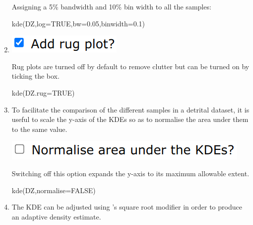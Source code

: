\begin{refsection}
\begin{enumerate}
Assigning a 5\% bandwidth and 10\% bin width to all the samples:

\begin{console}
kde(DZ,log=TRUE,bw=0.05,binwidth=0.1)
\end{console}

\item\noindent\begin{minipage}[t]{.18\linewidth}
\strut\vspace*{-\baselineskip}\newline
\includegraphics[width=\linewidth]{../figures/detritalrug.png}
\end{minipage}
\begin{minipage}[t]{.82\linewidth}
  Rug plots are turned off by default to remove clutter but can be
  turned on by ticking the box.
\end{minipage}

\begin{console}
kde(DZ.rug=TRUE)
\end{console}

\item To facilitate the comparison of the different samples in a
  detrital dataset, it is useful to scale the y-axis of the KDEs so as
  to normalise the area under them to the same value.

\noindent\begin{minipage}[t]{.38\linewidth}
\strut\vspace*{-\baselineskip}\newline
\includegraphics[width=\linewidth]{../figures/detritalKDEnormalise.png}
\end{minipage}
\begin{minipage}[t]{.62\linewidth}
Switching off this option expands the y-axis to its maximum allowable
extent.
\end{minipage}

\begin{console}
kde(DZ,normalise=FALSE)
\end{console}

\item The KDE can be adjusted using \citet{abramson1982}'s square root
  modifier in order to produce an adaptive density estimate.


\end{enumerate}
\end{refsection}
